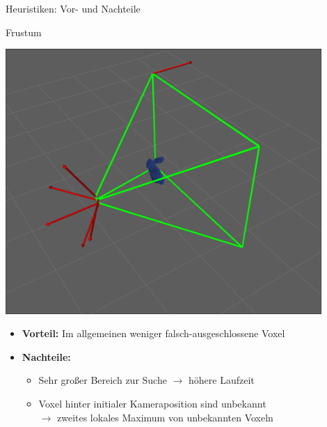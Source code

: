 \documentclass[aspectratio=169]{beamer}
\begin{document}
\begin{frame}{Heuristiken: Vor- und Nachteile}

	\begin{exampleblock}{Frustum}
		\begin{minipage}{0.49\textwidth}
			\begin{center}
				\includegraphics[width=0.9\textwidth]{Graphics/frustum_2.png}
			\end{center}
		\end{minipage}
		\hfill
		\begin{minipage}{0.5\textwidth}
			\begin{itemize}
				\item \textbf{Vorteil:} Im allgemeinen weniger falsch-ausgeschlossene Voxel
				\item \textbf{Nachteile:} \begin{itemize}
					      \item Sehr großer Bereich zur Suche $\rightarrow$ höhere Laufzeit
					      \item Voxel hinter initialer Kameraposition sind unbekannt \\ $\rightarrow$ zweites lokales Maximum von unbekannten Voxeln
				      \end{itemize}
			\end{itemize}
		\end{minipage}
	\end{exampleblock}
\end{frame}
\end{document}
